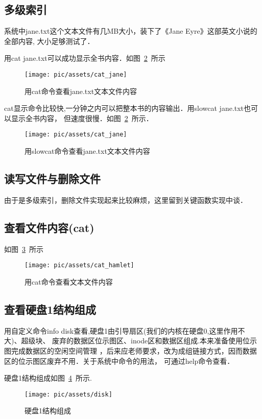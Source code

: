 \subsection{多级索引}

系统中jane.txt这个文本文件有几MB大小，装下了《Jane Eyre》这部英文小说的全部内容,
大小足够测试了．

用cat jane.txt可以成功显示全书内容．如图~\ref{cat_jane}~所示

\begin{figure}[!htbp]
	\centering	\texttt{[image: pic/assets/cat\_jane]}
	\caption{用cat命令查看jane.txt文本文件内容}	\label{cat_jane}	\end{figure}

cat显示命令比较快,一分钟之内可以把整本书的内容输出．用slowcat jane.txt也可以显示全书内容，
但速度很慢．如图~\ref{cat_jane}~所示．	

\begin{figure}[!htbp]
		\centering	\texttt{[image: pic/assets/cat\_jane]}
		\caption{用slowcat命令查看jane.txt文本文件内容}	\label{cat_jane}	\end{figure}

\subsection{读写文件与删除文件}

由于是多级索引，删除文件实现起来比较麻烦，这里留到关键函数实现中谈．

\subsection{查看文件内容(cat)}

如图~\ref{cat_hamlet}~所示

\begin{figure}[!htbp]
	\centering	\texttt{[image: pic/assets/cat\_hamlet]}
    \caption{用cat命令查看文本文件内容}	\label{cat_hamlet}	\end{figure}

\subsection{查看硬盘1结构组成}
用自定义命令info disk查看,硬盘1由引导扇区(我们的内核在硬盘0,这里作用不大)、超级块、
废弃的数据区位示图区、inode区和数据区组成.本来准备使用位示图完成数据区的空闲空间管理
，后来应老师要求，改为成组链接方式，因而数据区的位示图区废弃不用．关于系统中命令的用法，
可通过help命令查看．

硬盘1结构组成如图~\ref{disk}~所示.

\begin{figure}[!htbp]
	\centering	\texttt{[image: pic/assets/disk]}
    \caption{硬盘1结构组成}	\label{disk}	\end{figure}








